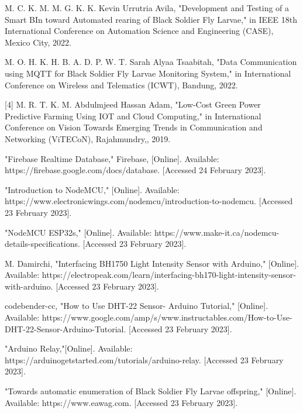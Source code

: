 \documentclass[conference]{IEEEtran}
\begin{document}
%
%
\begin{thebibliography}{99}
M. C. K. M. M. G. K. K. Kevin Urrutria Avila, "Development and Testing of a Smart BIn toward Automated rearing of Black Soldier Fly Larvae," in IEEE 18th International Conference on Automation Science and Engineering (CASE), Mexico City, 2022. 

M. O. H. K. H. B. A. D. P. W. T. Sarah Alyaa Tsaabitah, "Data Communication using MQTT for Black Soldier Fly Larvae Monitoring System," in International Conference on Wireless and Telematics (ICWT), Bandung, 2022. 


[4] 	M. R. T. K. M. Abdulmjeed Hassan Adam, "Low-Cost Green Power Predictive Farming Using IOT and Cloud Computing," in International Conference on Vision Towards Emerging Trends in Communication and Networking (ViTECoN), Rajahmundry,, 2019. 

"Firebase Realtime Database," Firebase, [Online]. Available: https://firebase.google.com/docs/database. [Accessed 24 February 2023].

"Introduction to NodeMCU," [Online]. Available: https://www.electronicwings.com/nodemcu/introduction-to-nodemcu. [Accessed 23 February 2023].

"NodeMCU ESP32s," [Online]. Available: https://www.make-it.ca/nodemcu-details-specifications. [Accessed 23 February 2023].

M. Damirchi, "Interfacing BH1750 Light Intensity Sensor with Arduino," [Online]. Available: https://electropeak.com/learn/interfacing-bh170-light-intensity-sensor-with-arduino. [Accessed 23 February 2023].

codebender-cc, "How to Use DHT-22 Sensor- Arduino Tutorial," [Online]. Available: https://www.google.com/amp/s/www.instructables.com/How-to-Use-DHT-22-Sensor-Arduino-Tutorial. [Accessed 23 February 2023].

"Arduino Relay,"[Online]. Available: https://arduinogetstarted.com/tutorials/arduino-relay. [Accessed 23 February 2023].


"Towards automatic enumeration of Black Soldier Fly Larvae offspring," [Online]. Available: https://www.eawag.com. [Accessed 23 February 2023].


\end{thebibliography}
\end{document}
